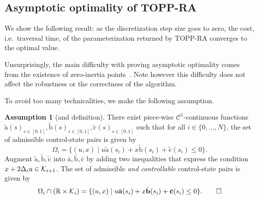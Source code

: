 \documentclass[journal]{IEEEtran}
\theoremstyle{plain}
\theoremstyle{definition}
\theoremstyle{definition}
\newtheorem{assum2}{Assumption}
\newenvironment{assum}
  {\renewcommand{\qedsymbol}{$\lozenge$}%
   \pushQED{\qed}\begin{assum2}}
  {\popQED\end{assum2}}
\renewcommand{\vec}[1]{\bm{\mathrm{#1}}}  %
\begin{document}
\subsection{Asymptotic optimality of TOPP-RA}
\label{sec:proof-correctness}

We show the following result: as the discretization step size goes to
zero, the cost, i.e.~traversal time, of the parameterization returned
by TOPP-RA converges to the optimal value.

Unsurprisingly, the main difficulty with proving asymptotic optimality
comes from the existence of zero-inertia
points~\cite{pfeiffer1987concept,shiller1992computation,pham2014general}. Note
however this difficulty does not affect the robustness or
the correctness of the algorithm.

To avoid too many technicalities, we make the following assumption.




\begin{assum}[and definition]
\label{assum:1}
There exist piece-wise $\mathcal{C}^{1}$-continuous functions
$\tilde{\vec a}(s)_{s\in [0, 1]}, \tilde{\vec b}(s)_{s\in [0, 1]},
\tilde{\vec c}(s)_{s\in [0, 1]}$ such that for all
$i\in \{0,\dots,N\}$, the set of admissible control-state pairs is
given by
\begin{equation*}
  \Omega_{i} = \{(u,x)\mid u\tilde{\vec a}(s_{i}) + x\tilde{\vec
    b}(s_{i}) + \tilde{\vec c}(s_{i}) \leq 0\}.
\end{equation*}
Augment $\tilde{\vec a},\tilde{\vec b},\tilde{\vec c}$ into
$\bar{\vec a},\bar{\vec b},\bar{\vec c}$ by adding two inequalities
that express the condition $x+2\Delta_{i}u\in{\cal K}_{i+1}$. The set of admissible
\emph{and controllable} control-state pairs is given by
\begin{equation*}
  \Omega_{i}\cap (\mathbb{R}\times \mathcal{K}_{i} )= \{(u,x)\mid u\bar{\vec a}(s_{i}) + x\bar{\vec
    b}(s_{i}) + \bar{\vec c}(s_{i}) \leq 0\}.\qedhere
\end{equation*}
\end{assum}
\end{document}

